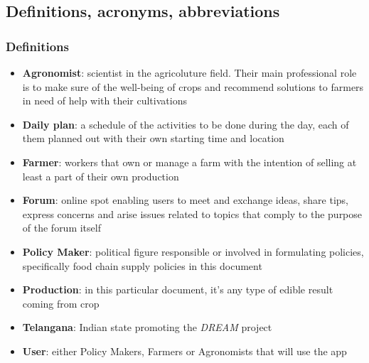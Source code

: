 \documentclass[table, 12pt]{article}
\begin{document}
\subsection{Definitions, acronyms, abbreviations}
\subsubsection*{Definitions}
\begin{itemize}
    \item \textbf{Agronomist}: scientist in the agricoluture field. Their main professional role is to make sure of the well-being of crops and recommend solutions to farmers in need of help with their cultivations 
    \item \textbf{Daily plan}: a schedule of the activities to be done during the day, each of them planned out with their own starting time and location
    \item \textbf{Farmer}: workers that own or manage a farm with the intention of selling at least a part of their own production
    \item \textbf{Forum}: online spot enabling users to meet and exchange ideas, share tips, express concerns and arise issues related to topics that comply to the purpose of the forum itself
    \item \textbf{Policy Maker}: political figure responsible or involved in formulating policies, specifically food chain supply policies in this document
    \item \textbf{Production}: in this particular document, it's any type of edible result coming from crop
    \item \textbf{Telangana}: Indian state promoting the \emph{DREAM} project
    \item \textbf{User}: either Policy Makers, Farmers or Agronomists that will use the app  
\end{itemize}
\end{document}

